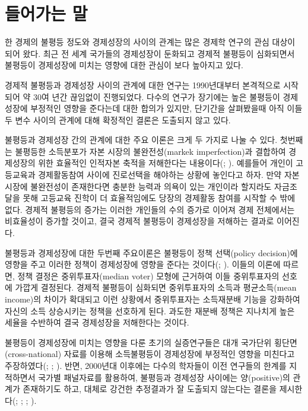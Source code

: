 \section{들어가는 말}
\label{ans4}
 한 경제의 불평등 정도와 경제성장의 사이의 관계는 많은 경제학 연구의 관심 대상이 되어 왔다. 최근 전 세계 국가들의 경제성장이 둔화되고 경제적 불평등이 심화되면서 불평등이 경제성장에 미치는 영향에 대한 관심이 보다 높아지고 있다.
 
경제적 불평등과 경제성장 사이의 관계에 대한 연구는 1990년대부터 본격적으로 시작되어 약 30여 년간 끊임없이 진행되었다.  다수의 연구가 장기에는 높은 불평등이 경제성장에 부정적인 영향을 준다는데 대한 합의가 있지만, 단기간을 살펴봤을때 아직 이들 두 변수 사이의 관계에 대해 확정적인 결론은 도출되지 않고 있다.

불평등과 경제성장 간의 관계에 대한 주요 이론은 크게 두 가지로 나눌 수 있다. 첫번째는 불평등한 소득분포가 자본 시장의 불완전성(markek imperfection)과 결합하여 경제성장의 위한 효율적인 인적자본 축적을 저해한다는 내용이다(\citet{gnz93}; \citet{loury81}). 예를들어 개인이 고등교육과 경제활동참여 사이에 진로선택을 해야하는 상황에 놓인다고 하자. 만약 자본시장에 불완전성이 존재한다면 충분한 능력과 의욕이 있는 개인이라 할지라도 자금조달을 못해 고등교육 진학이 더 효율적임에도 당장의 경제활동 참여를 시작할 수 밖에 없다. 경제적 불평등의 증가는 이러한 개인들의 수의 증가로 이어져 경제 전체에서는 비효율성이 증가할 것이고, 결국 경제적 불평등이 경제성장을 저해하는 결과로 이어진다.

불평등과 경제성장에 대한 두번째 주요이론은 불평등이 정책 선택(policy decision)에 영향을 주고 이러한 정책이 경제성장에 영향을 준다는 것이다(\citet{anr94}; \citet{pnt94}).  이들의 이론에 따르면, 정책 결정은 중위투표자(median voter) 모형에 근거하여 이들 중위투표자의 선호에 가깝게 결정된다. 경제적 불평등이 심화되면 중위투표자의 소득과 평균소득(mean income)의 차이가 확대되고 이런 상황에서 중위투표자는 소득재분배 기능을 강화하여 자신의 소득 상승시키는 정책을 선호하게 된다. 과도한 재분배 정책은 지나치게 높은 세율을 수반하여 결국 경제성장을 저해한다는 것이다.

불평등이 경제성장에 미치는 영향을 다룬 초기의 실증연구들은 대개 국가단위 횡단면(cross-national) 자료를 이용해 소득불평등이 경제성장에 부정적인 영향을 미친다고 주장하였다(\citet{barro91}; \citet{anr94}; \citet{pnt94}). 반면, 2000년대 이후에는 다수의 학자들이 이전 연구들의 한계를 지적하면서 국가별 패널자료를 활용하여, 불평등과 경제성장 사이에는 양(positive)의 관계가 존재하기도 하고, 대체로 강건한 추정결과가 잘 도출되지 않는다는 결론을 제시한다(\citet{lnz98}; \citet{barro20}; \citet{forbes00}; \citet{bnd03}).

